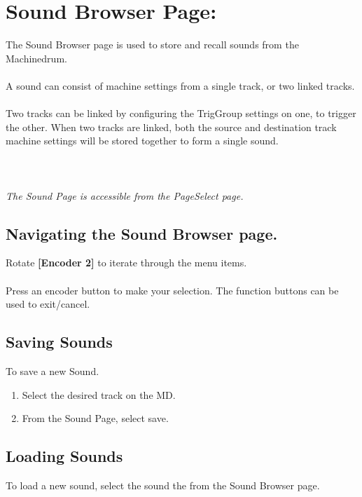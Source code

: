 \chapter{Sound Browser Page:}
The Sound Browser page is used to store and recall sounds from the Machinedrum.\\
\\
A sound can consist of machine settings from a single track, or two linked tracks.\\
\\
Two tracks can be linked by configuring the TrigGroup settings on one, to trigger the other. When two tracks are linked, both the source and destination track machine settings will be stored together to form a single sound.\\
\\
\\\\
 \textit{The Sound Page is accessible from the PageSelect page.}
 \section{Navigating the Sound Browser page.}
 Rotate \textbf{[Encoder 2]} to iterate through the menu items.\\
 \\Press an encoder button to make your selection.
 The function buttons can be used to exit/cancel.
 
 \section{Saving Sounds}
 To save a new Sound. 
\begin{enumerate}
 \item Select the desired track on the MD.
 \item From the Sound Page, select save.
\end{enumerate}
\section{Loading Sounds}
To load a new sound, select the sound the from the Sound Browser page.
